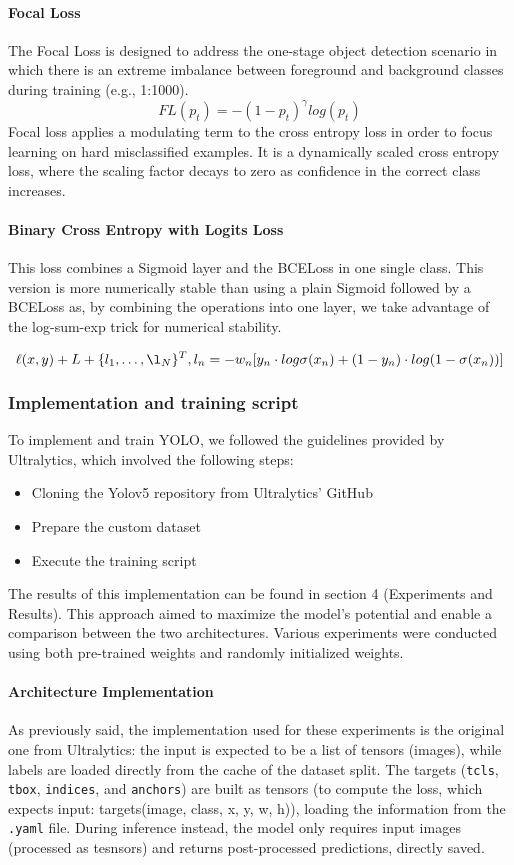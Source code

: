 \paragraph{Focal Loss}
The Focal Loss is designed to address the one-stage object detection scenario in which there is an extreme imbalance between foreground and background classes during training (e.g., 1:1000). \cite{focaloss}
$$FL(p_t) = - (1 - p_t)^{\gamma} log(p_t)$$
Focal loss applies a modulating term to the cross entropy loss in order to focus learning on hard misclassified examples. It is a dynamically scaled cross entropy loss, where the scaling factor decays to zero as confidence in the correct class increases.


\paragraph{Binary Cross Entropy with Logits Loss}
This loss combines a Sigmoid layer and the BCELoss in one single class. This version is more numerically stable than using a plain Sigmoid followed by a BCELoss as, by combining the operations into one layer, we take advantage of the log-sum-exp trick for numerical stability. \cite{doctorch}

$$\ell(x,y) + L + \{l_1, \dots, \l_N\}^T, l_n = -w_n [ y_n \cdot log \sigma(x_n) + (1-y_n) \cdot log(1 - \sigma(x_n))]$$


\subsubsection{Implementation and training script}
To implement and train YOLO, we followed the guidelines provided by Ultralytics, which involved the following steps:
\begin{itemize}
    \item Cloning the Yolov5 repository from Ultralytics' GitHub
    \item Prepare the custom dataset
    \item Execute the training script
\end{itemize}
The results of this implementation can be found in section 4 (Experiments and Results). This approach aimed to maximize the model's potential and enable a comparison between the two architectures. Various experiments were conducted using both pre-trained weights and randomly initialized weights.
\paragraph{Architecture Implementation}
As previously said, the implementation used for these experiments is the original one from Ultralytics: the input is expected to be a list of tensors (images), while labels are loaded directly from the cache of the dataset split. The targets (\texttt{tcls}, \texttt{tbox}, \texttt{indices}, and \texttt{anchors}) are built as tensors (to compute the loss, which expects input: targets(image, class, x, y, w, h)), loading the information from the \texttt{.yaml} file. During inference instead, the model only requires input images (processed as tesnsors) and returns post-processed predictions, directly saved. 

